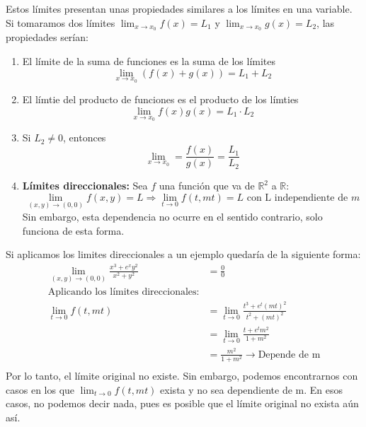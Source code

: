 \documentclass[11pt]{article}
\newcommand{\R}{\mathbb{R}}
\theoremstyle{plain}
\begin{document}
            Estos límites presentan unas propiedades similares a los límites en una variable. Si tomaramos dos límites $\lim_{x\to x_0} f(x) = L_1$ y $\lim_{x\to x_0} g(x) = L_2$, las propiedades serían:
            \begin{enumerate}[label = \Alph*]
                \item El límite de la suma de funciones es la suma de los límites \[\lim_{x\to x_0} (f(x)+g(x)) = L_1 + L_2\]
                \item El límtie del producto de funciones es el producto de los límties \[\lim_{x\to x_0} f(x)g(x) = L_1 \cdot L_2\]
                \item Si $L_2 \ne 0$, entonces \[\lim_{x\to x_0} = \frac{f(x)}{g(x)} = \frac{L_1}{L_2}\]
                \item \textbf{Límites direccionales:} Sea $f$ una función que va de $\R^2$ a $\R$: \[\lim_{(x,y) \to (0,0)} f(x,y) = L \Rightarrow \lim_{t \to 0} f(t,mt) = L \text{ con L independiente de $m$}\]
                Sin embargo, esta dependencia no ocurre en el sentido contrario, solo funciona de esta forma. 
            \end{enumerate}
            Si aplicamos los limites direccionales a un ejemplo quedaría de la siguiente forma:
            \begin{equation}
                \begin{aligned}
                    \lim_{(x,y) \to (0,0)} \frac{x^3 + e^x y^2}{x^2 + y^2} & = \frac{0}{0}\\
                    \text{Aplicando los límites direccionales:}\\
                    \lim_{t\to 0} f(t,mt) & = \lim_{t \to 0} \frac{t^3+e^t(mt)^2}{t^2 + (mt)^2}\\
                    & = \lim_{t \to 0} \frac{t + e^tm^2}{1 + m^2}\\
                    & = \frac{m^2}{1+m^2} \rightarrow \text{Depende de m}\\
                \end{aligned}
            \end{equation}
            Por lo tanto, el límite original no existe. Sin embargo, podemos encontrarnos con casos en los que $\lim_{t\to 0} f(t,mt)$ exista y no sea dependiente de m. En esos casos, no podemos decir nada, pues es posible que el límite original no exista aún así.

\end{document}
